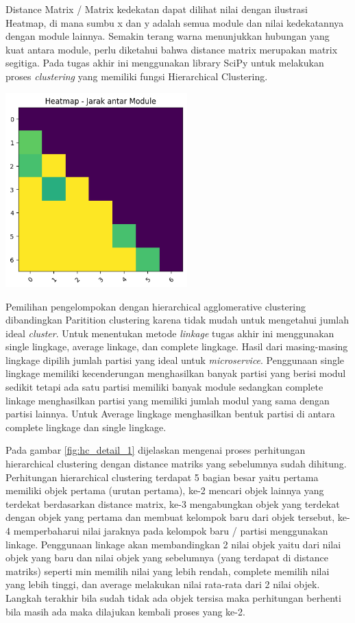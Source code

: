 Distance Matrix / Matrix kedekatan dapat dilihat nilai dengan ilustrasi Heatmap, di mana sumbu x dan y adalah semua module dan nilai kedekatannya dengan module lainnya. Semakin terang warna menunjukkan hubungan yang kuat antara module, perlu diketahui bahwa distance matrix merupakan matrix segitiga. Pada tugas akhir ini menggunakan library SciPy untuk melakukan proses \textit{clustering} yang memiliki fungsi Hierarchical Clustering.

\begin{center}
	\includegraphics[width=7cm]{img/bab_3/heatmap.png}
	\label{fig:asd}
\end{center}

Pemilihan pengelompokan dengan hierarchical agglomerative clustering dibandingkan Paritition clustering karena tidak mudah untuk mengetahui jumlah ideal \textit{cluster}. Untuk menentukan metode \textit{linkage} tugas akhir ini menggunakan single lingkage, average linkage, dan complete lingkage. Hasil dari masing-masing lingkage dipilih jumlah partisi yang ideal untuk \textit{microservice}. Penggunaan single lingkage memiliki kecenderungan menghasilkan banyak partisi yang berisi modul sedikit tetapi ada satu partisi memiliki banyak module sedangkan complete linkage menghasilkan partisi yang memiliki jumlah modul yang sama dengan partisi lainnya. Untuk Average lingkage menghasilkan bentuk partisi di antara complete lingkage dan single lingkage.

Pada gambar \ref{fig:hc_detail_1} dijelaskan mengenai proses perhitungan hierarchical clustering dengan distance matriks yang sebelumnya sudah dihitung. Perhitungan hierarchical clustering terdapat 5 bagian besar yaitu pertama memiliki objek pertama (urutan pertama), ke-2 mencari objek lainnya yang terdekat berdasarkan distance matrix, ke-3 mengabungkan objek yang terdekat dengan objek yang pertama dan membuat kelompok baru dari objek tersebut, ke-4 memperbaharui nilai jaraknya pada kelompok baru / partisi menggunakan linkage. Penggunaan linkage akan membandingkan 2 nilai objek yaitu dari nilai objek yang baru dan nilai objek yang sebelumnya (yang terdapat di distance matriks) seperti min memilih nilai yang lebih rendah, complete memilih nilai yang lebih tinggi, dan average melakukan nilai rata-rata dari 2 nilai objek. Langkah terakhir bila sudah tidak ada objek tersisa maka perhitungan berhenti bila masih ada maka dilajukan kembali proses yang ke-2.

